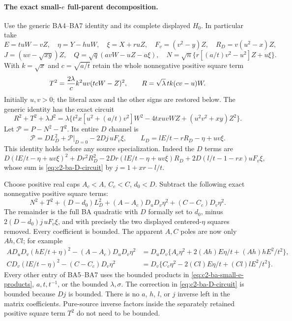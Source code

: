 \paragraph{The exact small-$e$ full-parent decomposition.}
Use the generic BA4--BA7 identity and its complete displayed $H_0$.
In particular take
\[
 E=tuW-vZ,\quad\eta=Y-huW,\quad\xi=X+ruZ,
 \quad F_v=(v^2-y)Z,\quad R_D=v(u^2-x)Z,
\]
\[
 J=(uv-\sqrt{xy})Z,\quad
 Q=\sqrt q(avW-uZ-a\xi),\quad
 N=\sqrt n\{r[(a/t)v^2-u^2]Z+u\xi\}.
\]
With $k=\sqrt x$ and $c=\sqrt{a/t}$ retain the whole nonnegative positive square term
\[
 T^2={2\lambda\over c}k^2uv(tcW-Z)^2,
 \qquad R=\sqrt\lambda\,tk(cv-u)W.
\]
Initially $u,v>0$; the literal axes and the other signs are restored below.
The generic identity has the exact circuit
\[
 R^2+T^2+\lambda J^2
 =\lambda\{t^2x[u^2+(a/t)v^2]W^2-4txuvWZ
                     +(u^2v^2+xy)Z^2\}.
\]
Let $\mathscr P=P-N^2-T^2$. Its entire $D$ channel is
\begin{equation}
 \mathscr P=D L_D^2+\mathscr P|_{D=0}-2Dj\,uF_v\xi,
 \qquad L_D=lE/t-rR_D-\eta+uv\xi.
 \label{eq:c2-ba-D-circuit}
\end{equation}
This identity holds before any source specialization. Indeed
the $D$ terms are
\[
 D(lE/t-\eta+uv\xi)^2+Dr^2R_D^2
 -2Dr(lE/t-\eta+uv\xi)R_D
 +2D(l/t-1-rx)uF_v\xi,
\]
whose sum is \eqref{eq:c2-ba-D-circuit} by $j=1+xr-l/t$.

Choose positive real caps $A_c<A$, $C_c<C$, $d_0<D$. Subtract the
following exact nonnegative positive square terms:
\begin{equation}
 N^2+T^2+(D-d_0)L_D^2
 +(A-A_c)D_uD_v\eta^2+(C-C_c)D_v\eta^2.
 \label{eq:c2-ba-excesses}
\end{equation}
The remainder is the full BA quadratic with $D$ formally set to $d_0$,
minus $2(D-d_0)j\,uF_v\xi$, and with precisely the two displayed
centered-$\eta$ squares removed. Every coefficient is bounded. The
apparent $A,C$ poles are now only $Ah,Cl$; for example
\[
 \begin{split}
 AD_uD_v(hE/t+\eta)^2-(A-A_c)D_uD_v\eta^2
 &=D_uD_v\{A_c\eta^2+2(Ah)E\eta/t+(Ah)hE^2/t^2\},\\
 CD_v(lE/t-\eta)^2-(C-C_c)D_v\eta^2
 &=D_v\{C_c\eta^2-2(Cl)E\eta/t+(Cl)lE^2/t^2\}.
 \end{split}
\]
Every other entry of BA5--BA7 uses the bounded products in
\eqref{eq:c2-ba-small-e-products}, $a,t,t^{-1}$, or the bounded
$\lambda,\sigma$. The correction in \eqref{eq:c2-ba-D-circuit} is
bounded because $Dj$ is bounded. There is no $a$, $h$, $l$, or $j$
inverse left in the matrix coefficients. Pure-source inverse factors
inside the separately retained positive square term $T^2$ do not need to
be bounded.

